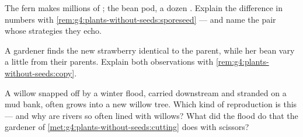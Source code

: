 \begin{exercise}[$\star\star$]\label{exo:g4:plants-without-seeds:9}
The fern makes millions of ; the bean pod, a dozen
. Explain the difference in numbers with
\cref{rem:g4:plants-without-seeds:sporeseed} --- and name the
 pair whose strategies they echo.
\end{exercise}

\begin{exercise}[$\star\star$]\label{exo:g4:plants-without-seeds:10}
A gardener finds the new strawberry  identical to the
parent, while her bean  vary a little from their
parents. Explain both observations with
\cref{rem:g4:plants-without-seeds:copy}.
\end{exercise}

\begin{exercise}[$\star\star\star$]\label{exo:g4:plants-without-seeds:11}
A willow  snapped off by a winter flood, carried
downstream and stranded on a mud bank, often grows into a new
willow tree. Which kind of reproduction is this --- and why
are rivers so often lined with willows? What did the flood do
that the gardener of
\cref{met:g4:plants-without-seeds:cutting} does with scissors?
\end{exercise}
